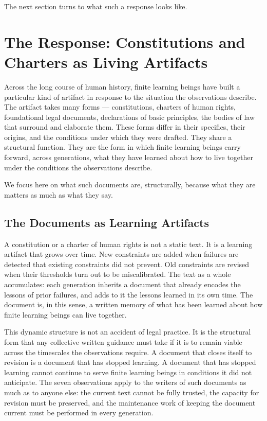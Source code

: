 \documentclass[11pt]{article}
\begin{document}
The next section turns to what such a response looks like.

\section{The Response: Constitutions and Charters as Living
Artifacts}

Across the long course of human history, finite learning beings
have built a particular kind of artifact in response to the
situation the observations describe. The artifact takes many
forms — constitutions, charters of human rights, foundational
legal documents, declarations of basic principles, the bodies of
law that surround and elaborate them. These forms differ in
their specifics, their origins, and the conditions under which
they were drafted. They share a structural function. They are
the form in which finite learning beings carry forward, across
generations, what they have learned about how to live together
under the conditions the observations describe.

We focus here on what such documents are, structurally, because
what they are matters as much as what they say.

\subsection{The Documents as Learning Artifacts}

A constitution or a charter of human rights is not a static text.
It is a learning artifact that grows over time. New constraints
are added when failures are detected that existing constraints
did not prevent. Old constraints are revised when their
thresholds turn out to be miscalibrated. The text as a whole
accumulates: each generation inherits a document that already
encodes the lessons of prior failures, and adds to it the
lessons learned in its own time. The document is, in this sense,
a written memory of what has been learned about how finite
learning beings can live together.

This dynamic structure is not an accident of legal practice. It
is the structural form that any collective written guidance must
take if it is to remain viable across the timescales the
observations require. A document that closes itself to revision
is a document that has stopped learning. A document that has
stopped learning cannot continue to serve finite learning beings
in conditions it did not anticipate. The seven observations apply
to the writers of such documents as much as to anyone else: the
current text cannot be fully trusted, the capacity for revision
must be preserved, and the maintenance work of keeping the
document current must be performed in every generation.
\end{document}
